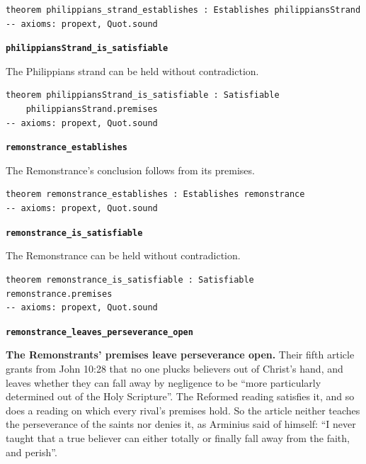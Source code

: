 \documentclass[11pt]{article}
\begin{document}
{\small\begin{verbatim}
theorem philippians_strand_establishes : Establishes philippiansStrand
-- axioms: propext, Quot.sound
\end{verbatim}}
\par\medskip\noindent\textbf{\texttt{philippians\allowbreak{}Strand\_\allowbreak{}is\_\allowbreak{}satisfiable}}\par\nobreak\noindent
The Philippians strand can be held without contradiction.

{\small\begin{verbatim}
theorem philippiansStrand_is_satisfiable : Satisfiable
    philippiansStrand.premises
-- axioms: propext, Quot.sound
\end{verbatim}}
\par\medskip\noindent\textbf{\texttt{remonstrance\_\allowbreak{}establishes}}\par\nobreak\noindent
The Remonstrance’s conclusion follows from its premises.

{\small\begin{verbatim}
theorem remonstrance_establishes : Establishes remonstrance
-- axioms: propext, Quot.sound
\end{verbatim}}
\par\medskip\noindent\textbf{\texttt{remonstrance\_\allowbreak{}is\_\allowbreak{}satisfiable}}\par\nobreak\noindent
The Remonstrance can be held without contradiction.

{\small\begin{verbatim}
theorem remonstrance_is_satisfiable : Satisfiable remonstrance.premises
-- axioms: propext, Quot.sound
\end{verbatim}}
\par\medskip\noindent\textbf{\texttt{remonstrance\_\allowbreak{}leaves\_\allowbreak{}perseverance\_\allowbreak{}open}}\par\nobreak\noindent
\textbf{The Remonstrants’ premises leave perseverance open.} Their fifth article grants from John 10:28 that no one plucks believers out of Christ’s hand, and leaves whether they can fall away by negligence to be “more particularly determined out of the Holy Scripture”. The Reformed reading satisfies it, and so does a reading on which every rival’s premises hold. So the article neither teaches the perseverance of the saints nor denies it, as Arminius said of himself: “I never taught that a true believer can either totally or finally fall away from the faith, and perish”.
\end{document}
